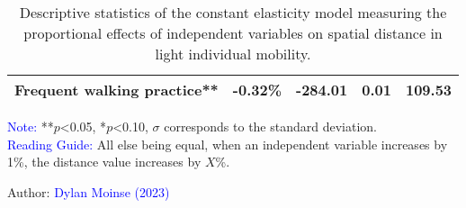 \begin{table}[h!]
{\begin{tabular}{p{}p{}p{}p{}p{}}
\small{Frequent walking practice**} & \small{\textbf{-0.32\%}} & \small{-284.01} & \small{0.01} & \small{109.53}\\
        \hline
        \end{tabular}}
    \caption{Descriptive statistics of the constant elasticity model measuring the proportional effects of independent variables on spatial distance in light individual mobility.}
    \label{table-chap5:facteurs-distance-spatiale}
        \vspace{5pt}
        \begin{flushleft}\scriptsize{
        \textcolor{blue}{Note:} **$p$\textless0.05, *$p$\textless0.10, $\sigma$ corresponds to the standard deviation.
        \\
        \textcolor{blue}{Reading Guide:} All else being equal, when an independent variable increases by 1\%, the distance value increases by $X$\%.
        }\end{flushleft}
        \begin{flushright}\scriptsize
        Author: \textcolor{blue}{Dylan Moinse (2023)}
        \end{flushright}
        \end{table}